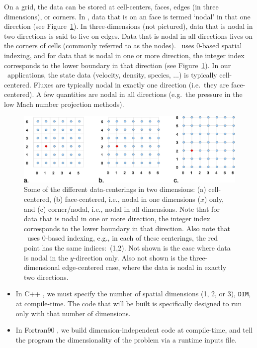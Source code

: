On a grid, the data can be stored at cell-centers, faces, edges (in three dimensions), or
corners.  In \BoxLib, data that is on an face is termed `nodal'
in that one direction (see Figure~\ref{fig:dataloc}).  In three-dimensions (not pictured),
data that is nodal in two directions is said to live on edges.  Data that is nodal in
all directions lives on the corners of cells (commonly referred to as the nodes).
\BoxLib\ uses $0$-based spatial indexing, and for data that is nodal in one or more direction,
the integer index corresponds to the lower boundary in that direction (see Figure~\ref{fig:dataloc}).
In our \BoxLib\ applications, the state data (velocity, density, 
species, $\ldots$) is typically cell-centered.  Fluxes are typically nodal in exactly
one direction (i.e.~they are face-centered).  A few quantities are nodal in all 
directions (e.g.~the pressure in the low Mach number projection methods).
\begin{figure}[htb]
\centering
\includegraphics[width=6.5in]{./Introduction/data_loc2}
\caption{\label{fig:dataloc} Some of the different data-centerings in two dimensions:
(a) cell-centered, (b) face-centered, i.e., nodal in one dimensions ($x$) only, and (c) corner/nodal,
i.e., nodal in all dimensions.  Note that for data that is nodal in one or more direction,
the integer index corresponds to the lower boundary in that direction.
Also note that \BoxLib\ uses $0$-based indexing, e.g., in each of these centerings, 
the red point has the same indices:\ (1,2).
Not shown is the case where data is nodal in the $y$-direction only.  
Also not shown is the three-dimensional edge-centered case, where the data
is nodal in exactly two directions.}
\end{figure}

\begin{itemize}
\item In C++ \BoxLib, we must specify the number of spatial dimensions (1, 2, or 3), 
{\tt DIM}, at compile-time.  The code that will be built is specifically designed to 
run only with that number of dimensions.
\item In Fortran90 \BoxLib, we build dimension-independent code at compile-time, 
and tell the program the dimensionality of the problem via a runtime inputs file.
\end{itemize}


